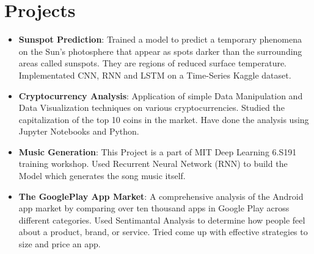\documentclass[letterpaper,11pt]{article}
\newcommand{\resumeItem}[2]{
  \item\small{
    \textbf{#1}{: #2 \vspace{-2pt}}
  }
}
\newcommand{\resumeSubItem}[2]{\resumeItem{#1}{#2}\vspace{-4pt}}
\newcommand{\resumeSubHeadingListStart}{\begin{itemize}[leftmargin=*]}
\newcommand{\resumeSubHeadingListEnd}{\end{itemize}}
\begin{document}
\section{Projects}
  \resumeSubHeadingListStart
    \resumeSubItem{Sunspot Prediction}
      {Trained a model to predict a temporary phenomena on the Sun's photosphere that appear as spots darker than the surrounding areas called sunspots. They are regions of reduced surface temperature. Implementated CNN, RNN and LSTM on a Time-Series Kaggle dataset.}
    \resumeSubItem{Cryptocurrency Analysis}
      {Application of simple Data Manipulation and Data Visualization techniques on various cryptocurrencies. Studied the capitalization of the top 10 coins in the market. Have done the analysis using Jupyter Notebooks and Python.}
    \resumeSubItem{Music Generation}
      {This Project is a part of MIT Deep Learning 6.S191 training workshop. Used Recurrent Neural Network (RNN) to build the Model which generates the song music itself.}
    \resumeSubItem{The GooglePlay App Market}
      {A comprehensive analysis of the Android app market by comparing over ten thousand apps in Google Play across different categories. Used Sentimantal Analysis to determine how people feel about a product, brand, or service. Tried come up with effective strategies to size and price an app.}
  \resumeSubHeadingListEnd

%


\end{document}
